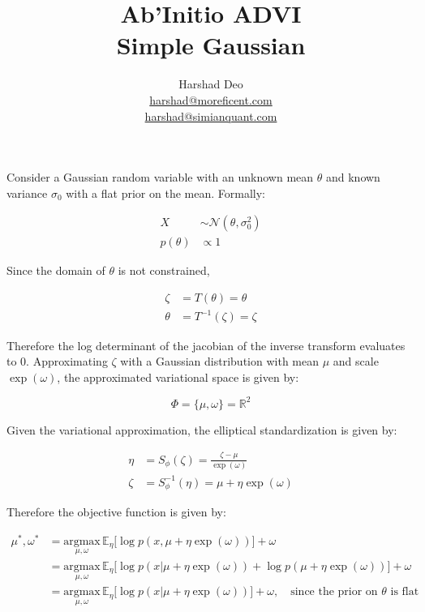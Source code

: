 \documentclass[10pt]{article}
\title{Ab'Initio ADVI \\ Simple Gaussian}
\author{Harshad Deo \\ 
  \href{mailto:harshad@moreficent.com}{harshad@moreficent.com} \\ 
  \href{mailto:harshad@simianquant.com}{harshad@simianquant.com}
}
\date{}
\begin{document}
  
\maketitle

Consider a Gaussian random variable with an unknown mean $\theta$ and known variance $\sigma_0$ with a flat prior on
the mean. Formally:

\begin{align*}
  X &\sim \mathcal{N}(\theta, \sigma_0^2)\\
  p(\theta) &\varpropto 1
\end{align*}

Since the domain of $\theta$ is not constrained, 

\begin{align*}
  \zeta &= T(\theta) = \theta \\
  \theta &= T^{-1}(\zeta) = \zeta
\end{align*}

Therefore the log determinant of the jacobian of the inverse transform evaluates to 0. Approximating $\zeta$ with a 
Gaussian distribution with mean $\mu$ and scale $\exp(\omega)$, the approximated variational space is given by:

\begin{equation*}
  \Phi = \{\mu, \omega\} = \mathbb{R}^2
\end{equation*}

Given the variational approximation, the elliptical standardization is given by:

\begin{align*}
  \eta &= S_{\phi}(\zeta) = \frac{\zeta - \mu}{\exp(\omega)} \\
  \zeta &= S_{\phi}^{-1}(\eta) = \mu + \eta \exp(\omega)
\end{align*}

Therefore the objective function is given by:

\begin{align*}
  \mu^*, \omega^* &= \underset{\mu, \omega}{\text{argmax}}\,\mathbb{E}_\eta\big[\log p(x, \mu + \eta\exp(\omega)) \big] + \omega \\
  &= \underset{\mu, \omega}{\text{argmax}}\,\mathbb{E}_\eta\big[\log p(x | \mu + \eta\exp(\omega)) + \log p(\mu + \eta \exp(\omega))] + \omega \\
  &= \underset{\mu, \omega}{\text{argmax}}\,\mathbb{E}_\eta\big[\log p(x | \mu + \eta\exp(\omega))] + \omega, \quad \text{since the prior on $\theta$ is flat}
\end{align*}
\end{document}
